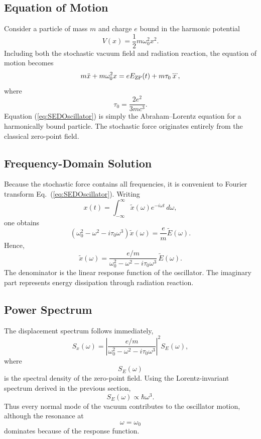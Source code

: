 \subsection{Equation of Motion}
Consider a particle of mass $m$ and charge $e$ bound in the harmonic
potential
\begin{equation}
V(x)=\frac12 m\omega_0^2x^2.
\end{equation}
Including both the stochastic vacuum field and radiation reaction, the
equation of motion becomes
\begin{equation}
m\ddot x+m\omega_0^2x=eE_{\rm ZP}(t)+m\tau_0\dddot x,
\label{eq:SEDOscillator}
\end{equation}
where
\[\tau_0=\frac{2e^2}{3mc^3}.\]
Equation (\ref{eq:SEDOscillator}) is simply the Abraham--Lorentz
equation for a harmonically bound particle.
The stochastic force originates entirely from the classical zero-point
field.
\subsection{Frequency-Domain Solution}
Because the stochastic force contains all frequencies, it is convenient
to Fourier transform Eq.~(\ref{eq:SEDOscillator}).
Writing
\[x(t)=\int_{-\infty}^{\infty}\tilde x(\omega)e^{-i\omega t}\,d\omega,\]
one obtains
\begin{equation}
\left(\omega_0^2-\omega^2-i\tau_0\omega^3\right)\tilde x(\omega)=
\frac{e}{m}\tilde E(\omega).
\end{equation}
Hence,
\begin{equation}
\boxed{\tilde x(\omega)=
\frac{e/m}{\omega_0^2-\omega^2-i\tau_0\omega^3}\,\tilde E(\omega).}
\label{eq:ResponseFunction}
\end{equation}
The denominator is the linear response function of the oscillator.
The imaginary part represents energy dissipation through radiation
reaction.
\subsection{Power Spectrum}
The displacement spectrum follows immediately,
\begin{equation}
S_x(\omega)=\left|\frac{e/m}{\omega_0^2-\omega^2-i\tau_0\omega^3}\right|^2 
    S_E(\omega),
\label{eq:PowerSpectrum}
\end{equation}
where
\[S_E(\omega)\]
is the spectral density of the zero-point field.
Using the Lorentz-invariant spectrum derived in the previous section,
\begin{equation}
S_E(\omega)\propto\hbar\omega^3.
\end{equation}
Thus every normal mode of the vacuum contributes to the oscillator
motion, although the resonance at
\[\omega=\omega_0\]
dominates because of the response function.
